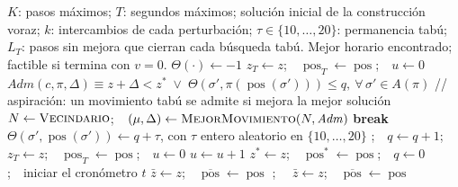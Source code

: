 \documentclass{article}
\begin{document}
\begin{algorithm}[H]
\caption{$\textsc{ITS}(K, T)$ --- búsqueda tabú iterada}
\label{alg:its}
\begin{algorithmic}[1]
\Require $K$: pasos máximos; $T$: segundos máximos; solución inicial de la construcción voraz;
         $k$: intercambios de cada perturbación; $\tau \in \{10,\dots,20\}$: permanencia tabú;
         $L_T$: pasos sin mejora que cierran cada búsqueda tabú.
\Ensure Mejor horario encontrado; factible si termina con $v = 0$.
 
    \State $\Theta(\cdot) \gets -1$ 
    \State $z_T \gets z$;\ \ $\operatorname{pos}_T \gets \operatorname{pos}$;\ \ $u \gets 0$ 
        \State $\mathit{Adm}(c, \pi, \Delta) \equiv z + \Delta < z^* \;\vee\; \Theta(\sigma', \pi(\operatorname{pos}(\sigma'))) \le q,\ \forall\, \sigma' \in A(\pi)$
        \Statex \hfill{\small // aspiración: un movimiento tabú se admite si mejora la mejor solución}
        \State $N \gets \Call{Vecindario}{}$;\ \ $(\mu, \Delta) \gets \Call{MejorMovimiento}{N, \mathit{Adm}}$
            \State \textbf{break} 
        \EndIf
            \State $\Theta(\sigma', \operatorname{pos}(\sigma')) \gets q + \tau$, con $\tau$ entero aleatorio en $\{10, \dots, 20\}$
        \EndFor
        \State {};\ \ $q \gets q + 1$;\ \  
            \State $z_T \gets z$;\ \ $\operatorname{pos}_T \gets \operatorname{pos}$;\ \ $u \gets 0$
        \Else
            \State $u \gets u + 1$
        \EndIf
    \EndWhile
        \State {} 
    \EndIf
\EndProcedure
\Statex
\State $z^* \gets z$;\ \ $\operatorname{pos}^* \gets \operatorname{pos}$;\ \ $q \gets 0$;\ \ iniciar el cronómetro $t$
\State {} 
\State $\bar z \gets z$;\ \ $\overline{\operatorname{pos}} \gets \operatorname{pos}$ 
    \State {};\ \  
    \State {} 
     
        \State $\bar z \gets z$;\ \ $\overline{\operatorname{pos}} \gets \operatorname{pos}$
        \State {} 
    \EndIf
\EndWhile
{}
    \State {} 
\EndIf
\end{algorithmic}
\end{algorithm}
\end{document}
